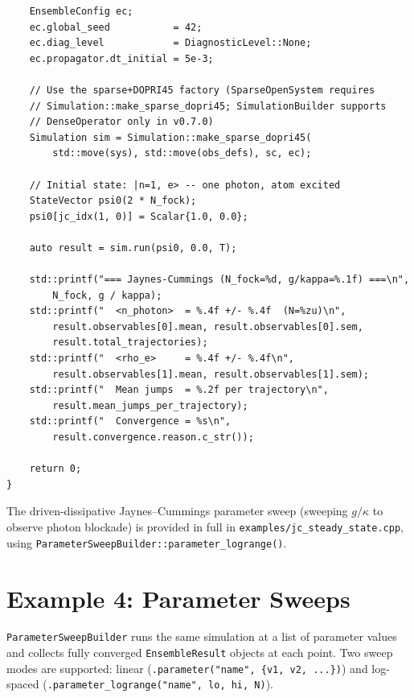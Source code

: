 \documentclass[11pt,a4paper,twoside]{book}
\newcommand{\code}[1]{\texttt{\small#1}}
\newcommand{\filename}[1]{\texttt{#1}}
\theoremstyle{definition}
\theoremstyle{remark}
\begin{document}
\begin{verbatim}
    EnsembleConfig ec;
    ec.global_seed           = 42;
    ec.diag_level            = DiagnosticLevel::None;
    ec.propagator.dt_initial = 5e-3;

    // Use the sparse+DOPRI45 factory (SparseOpenSystem requires
    // Simulation::make_sparse_dopri45; SimulationBuilder supports
    // DenseOperator only in v0.7.0)
    Simulation sim = Simulation::make_sparse_dopri45(
        std::move(sys), std::move(obs_defs), sc, ec);

    // Initial state: |n=1, e> -- one photon, atom excited
    StateVector psi0(2 * N_fock);
    psi0[jc_idx(1, 0)] = Scalar{1.0, 0.0};

    auto result = sim.run(psi0, 0.0, T);

    std::printf("=== Jaynes-Cummings (N_fock=%d, g/kappa=%.1f) ===\n",
        N_fock, g / kappa);
    std::printf("  <n_photon>  = %.4f +/- %.4f  (N=%zu)\n",
        result.observables[0].mean, result.observables[0].sem,
        result.total_trajectories);
    std::printf("  <rho_e>     = %.4f +/- %.4f\n",
        result.observables[1].mean, result.observables[1].sem);
    std::printf("  Mean jumps  = %.2f per trajectory\n",
        result.mean_jumps_per_trajectory);
    std::printf("  Convergence = %s\n",
        result.convergence.reason.c_str());

    return 0;
}
\end{verbatim}

\begin{notebox}
  The driven-dissipative Jaynes--Cummings parameter sweep (sweeping $g/\kappa$
  to observe photon blockade) is provided in full in
  \filename{examples/jc\_steady\_state.cpp}, using
  \code{ParameterSweepBuilder::parameter\_logrange()}.
\end{notebox}

\section{Example 4: Parameter Sweeps}
\label{sec:ex-sweep}

\code{ParameterSweepBuilder} runs the same simulation at a list of
parameter values and collects fully converged \code{EnsembleResult}
objects at each point. Two sweep modes are supported: linear
(\code{.parameter("name", \{v1, v2, ...\})}) and log-spaced
(\code{.parameter\_logrange("name", lo, hi, N)}).
\end{document}
